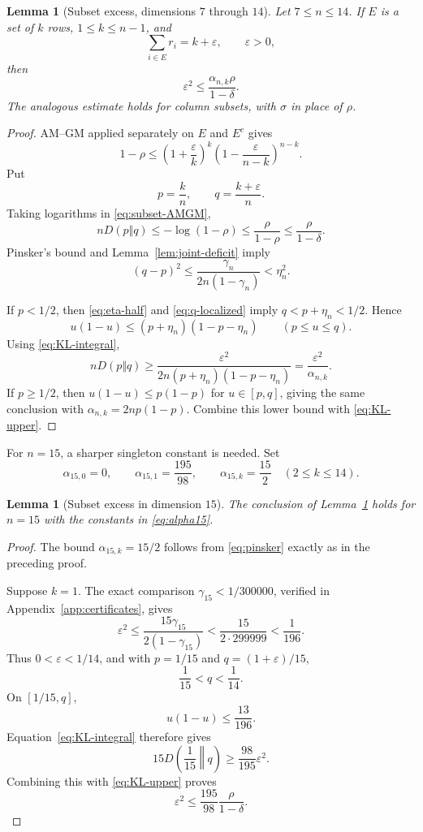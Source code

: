 \documentclass[11pt]{article}
\newtheorem{lemma}[theorem]{Lemma}
\theoremstyle{definition}
\newcommand{\1}{\mathbf{1}}
\newcommand{\eps}{\varepsilon}
\begin{document}
\begin{lemma}[Subset excess, dimensions $7$ through $14$]\label{lem:subset-mid}
Let $7\le n\le14$.  If $E$ is a set of $k$ rows, $1\le k\le n-1$, and
\[
 \sum_{i\in E}r_i=k+\eps,
 \qquad \eps>0,
\]
then
\[
 \eps^2\le\frac{\alpha_{n,k}\rho}{1-\delta}.
 \tag{5.13}\label{eq:subset-mid}
\]
The analogous estimate holds for column subsets, with $\sigma$ in place of $\rho$.
\end{lemma}

\begin{proof}
AM--GM applied separately on $E$ and $E^c$ gives
\[
 1-\rho
 \le
 \left(1+\frac{\eps}{k}\right)^k
 \left(1-\frac{\eps}{n-k}\right)^{n-k}.
 \tag{5.14}\label{eq:subset-AMGM}
\]
Put
\[
 p=\frac{k}{n},
 \qquad
 q=\frac{k+\eps}{n}.
\]
Taking logarithms in \eqref{eq:subset-AMGM},
\[
 nD(p\Vert q)\le-\log(1-\rho)
 \le\frac{\rho}{1-\rho}
 \le\frac{\rho}{1-\delta}.
 \tag{5.15}\label{eq:KL-upper}
\]
Pinsker's bound and Lemma~\ref{lem:joint-deficit} imply
\[
 (q-p)^2
 \le\frac{\gamma_n}{2n(1-\gamma_n)}
 <\eta_n^2.
 \tag{5.16}\label{eq:q-localized}
\]

If $p<1/2$, then \eqref{eq:eta-half} and \eqref{eq:q-localized} imply $q<p+\eta_n<1/2$.  Hence
\[
 u(1-u)\le(p+\eta_n)(1-p-\eta_n)
 \qquad(p\le u\le q).
\]
Using \eqref{eq:KL-integral},
\[
 nD(p\Vert q)
 \ge\frac{\eps^2}
 {2n(p+\eta_n)(1-p-\eta_n)}
 =\frac{\eps^2}{\alpha_{n,k}}.
\]
If $p\ge1/2$, then $u(1-u)\le p(1-p)$ for $u\in[p,q]$, giving the same conclusion with $\alpha_{n,k}=2np(1-p)$.  Combine this lower bound with \eqref{eq:KL-upper}.
\end{proof}

For $n=15$, a sharper singleton constant is needed.  Set
\[
 \alpha_{15,0}=0,
 \qquad
 \alpha_{15,1}=\frac{195}{98},
 \qquad
 \alpha_{15,k}=\frac{15}{2}\quad(2\le k\le14).
 \tag{5.17}\label{eq:alpha15}
\]

\begin{lemma}[Subset excess in dimension $15$]\label{lem:subset15}
The conclusion of Lemma~\ref{lem:subset-mid} holds for $n=15$ with the constants in \eqref{eq:alpha15}.
\end{lemma}

\begin{proof}
The bound $\alpha_{15,k}=15/2$ follows from \eqref{eq:pinsker} exactly as in the preceding proof.

Suppose $k=1$.  The exact comparison $\gamma_{15}<1/300000$, verified in Appendix~\ref{app:certificates}, gives
\[
 \eps^2
 \le\frac{15\gamma_{15}}{2(1-\gamma_{15})}
 <\frac{15}{2\cdot299999}<\frac1{196}.
\]
Thus $0<\eps<1/14$, and with $p=1/15$ and $q=(1+\eps)/15$,
\[
 \frac1{15}<q<\frac1{14}.
\]
On $[1/15,q]$,
\[
 u(1-u)\le\frac{13}{196}.
\]
Equation~\eqref{eq:KL-integral} therefore gives
\[
 15D\left(\frac1{15}\middle\Vert q\right)
 \ge\frac{98}{195}\eps^2.
\]
Combining this with \eqref{eq:KL-upper} proves
\[
 \eps^2\le\frac{195}{98}\frac{\rho}{1-\delta}.
\]
\end{proof}
\end{document}

